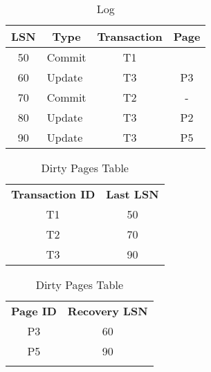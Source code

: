 \begin{table}[H]
\centering
\begin{tabular}{|c|l|c|c|}
\hline
\textbf{LSN}           & \multicolumn{1}{c|}{\textbf{Type}} & \textbf{Transaction}  & \textbf{Page}         \\ \hline
50                     & Commit                             & T1                    &                       \\ \hline
60                     & Update                             & T3                    & P3                    \\ \hline
70                     & Commit                             & T2                    & -                     \\ \hline
80                     & Update                             & T3                    & P2                    \\ \hline
90                     & Update                             & T3                    & P5                    \\ \hline
\end{tabular}
\caption{Log}
\end{table}


\begin{table}[H]
    \begin{minipage}{.5\linewidth}
      \centering
		\begin{tabular}{|c|c|}
		\cline{1-2}
		\textbf{Transaction ID} & \textbf{Last LSN} \\ \cline{1-2}
		T1             & 50       \\ \cline{1-2}
		T2             & 70       \\ \cline{1-2}
		T3             & 90       \\ \cline{1-2}
		\end{tabular}
      \caption{Active Transactions Table}

    \end{minipage}%
    \begin{minipage}{.5\linewidth}
      \centering
		\begin{tabular}{|c|c|}
		\cline{1-2}
		\textbf{Page ID} & \textbf{Recovery LSN} \\ \cline{1-2}
		P3      & 60           \\ \cline{1-2}
		P5      & 90           \\ \cline{1-2}
		        &              \\ \cline{1-2}
		\end{tabular}
        \caption{Dirty Pages Table}

    \end{minipage} 
\end{table}


